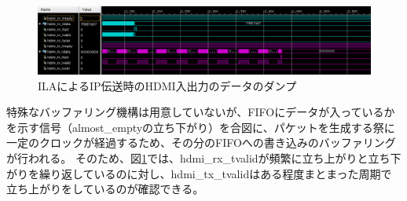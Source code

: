 \begin{figure}[htbp]
    \begin{center}
        \includegraphics[bb=0 0 1199 246,width=15.5cm]{img/fpga-ila-hdmi.png}
    \end{center}
    \caption{ILAによるIP伝送時のHDMI入出力のデータのダンプ}
    \label{fig:fpga-ila-hdmi}
\end{figure}


特殊なバッファリング機構は用意していないが、FIFOにデータが入っているかを示す信号（almost\_emptyの立ち下がり）を合図に、パケットを生成する祭に一定のクロックが経過するため、その分のFIFOへの書き込みのバッファリングが行われる。
そのため、図\ref{fig:fpga-ila-hdmi}では、hdmi\_rx\_tvalidが頻繁に立ち上がりと立ち下がりを繰り返しているのに対し、hdmi\_tx\_tvalidはある程度まとまった周期で立ち上がりをしているのが確認できる。
